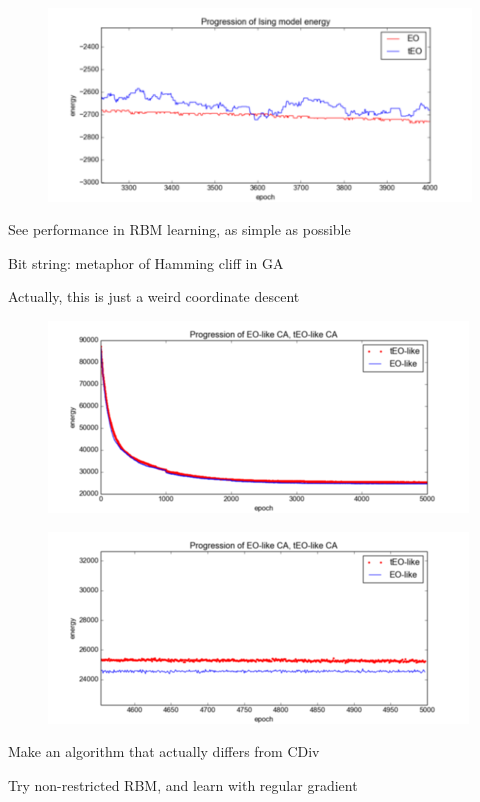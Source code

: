 \documentclass[12pt]{article}
\begin{document}
  \begin{figure}
    \includegraphics{ising_energy_zoomed}
  \end{figure}

  See performance in RBM learning, as simple as possible

  Bit string: metaphor of Hamming cliff in GA

  Actually, this is just a weird coordinate descent
  
  \begin{figure}
    \includegraphics{eo_rbm_unzoomed}
  \end{figure}
 
  \begin{figure}
    \includegraphics{eo_rbm_zoomed}
  \end{figure}

  Make an algorithm that actually differs from CDiv

  Try non-restricted RBM, and learn with regular gradient
\end{document}

